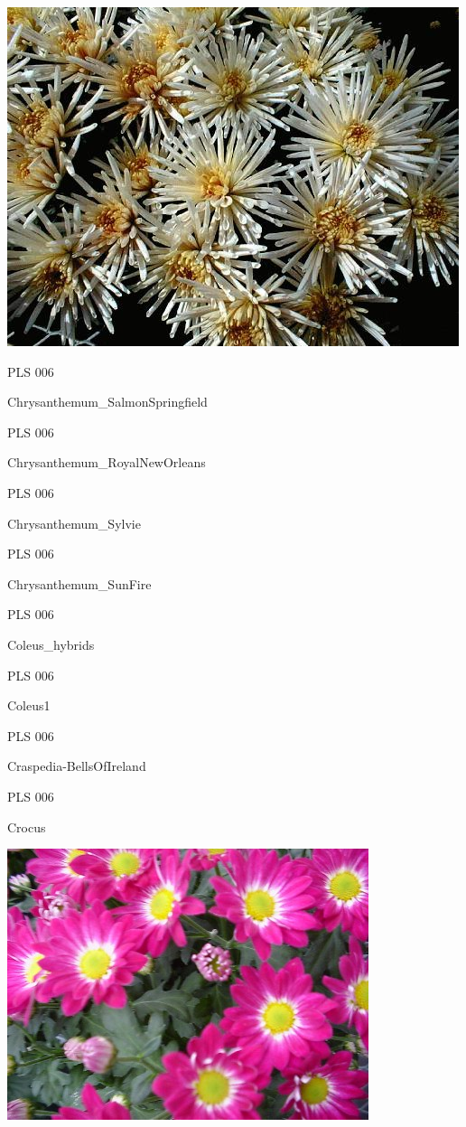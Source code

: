 \documentclass{article}
\begin{document}
\begin{center}
\includegraphics[height=0.925\paperheight]{../Chrysanthemum_Quill2.jpg}
\end{center}
\newpage

\noindent  PLS 006
\vfill
\centerline{{\huge Chrysanthemum\_SalmonSpringfield }}
\vfill
\newpage

\noindent  PLS 006
\vfill
\centerline{{\huge Chrysanthemum\_RoyalNewOrleans }}
\vfill
\newpage

\noindent  PLS 006
\vfill
\centerline{{\huge Chrysanthemum\_Sylvie }}
\vfill
\newpage

\noindent  PLS 006
\vfill
\centerline{{\huge Chrysanthemum\_SunFire }}
\vfill
\newpage

\noindent  PLS 006
\vfill
\centerline{{\huge Coleus\_hybrids }}
\vfill
\newpage

\noindent  PLS 006
\vfill
\centerline{{\huge Coleus1 }}
\vfill
\newpage

\noindent  PLS 006
\vfill
\centerline{{\huge Craspedia-BellsOfIreland }}
\vfill
\newpage

\noindent  PLS 006
\vfill
\centerline{{\huge Crocus }}
\vfill
\newpage

\begin{center}
\includegraphics[height=0.925\paperheight]{../Chrysanthemum_RoyalNewOrleans.jpg}
\end{center}
\newpage
\end{document}
